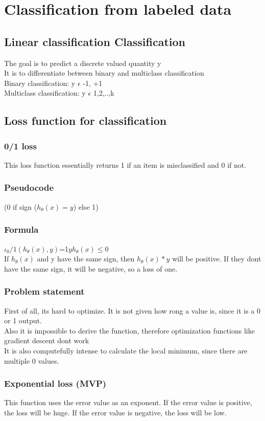 \documentclass{article}
\begin{document}
\section{Classification from labeled data}
\subsection{Linear classification Classification}
The goal is to predict a discrete valued quantity y \\ 
It is to differentiate between binary and multiclass classification\\
Binary classification: y $\epsilon$ {-1, +1}\\
Multiclass classification: y $\epsilon$ {1,2,..,k}\\
\subsection{Loss function for classification}
\subsubsection{0/1 loss}
This loss function essentially returns 1 if an item is misclassified and 0 if not. 
\subsubsection{Pseudocode}
(0 if sign ($h_\theta(x)=y$) else 1)
\subsubsection{Formula}
$\iota_0/1(h_\theta(x),y)$=1{$yh_\theta(x)\leq 0$}\\ 
If $h_\theta(x)$ and y have the same sign, then $h_\theta(x)*y$ will be positive. If they dont have the same sign, it will be negative, so a loss of one.
\subsubsection{Problem statement}
First of all, its hard to optimize. It is not given how rong a value is, since it is a 0 or 1 output. \\
Also it is impossible to derive the function, therefore optimization functions like gradient descent dont work \\ 
It is also computefully intense to calculate the local minimum, since there are multiple 0 values. 
\subsubsection{Exponential loss (MVP)}
This function uses the error value as an exponent. If the error value is positive, the loss will be huge. 
If the error value is negative, the loss will be low. 
\end{document}
